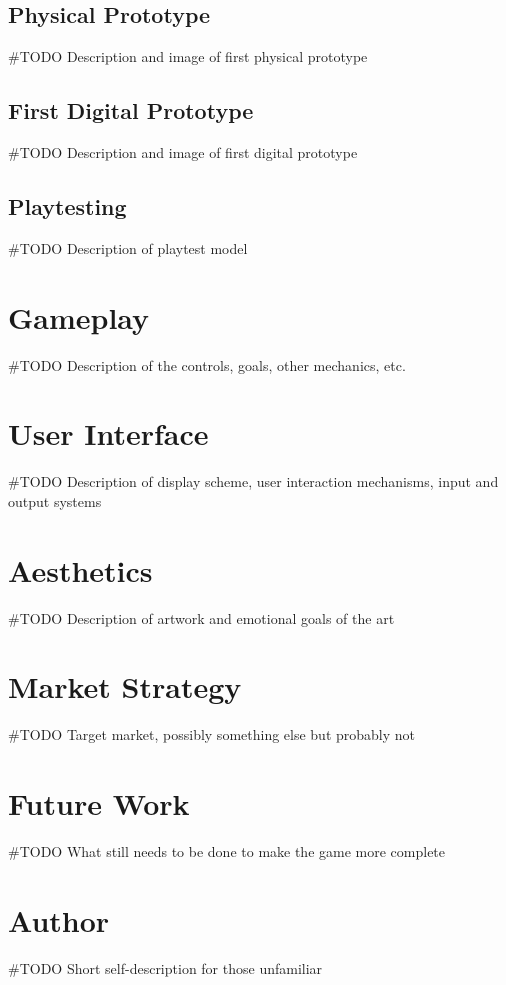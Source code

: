\documentclass{scrreprt}
\begin{document}
		\section{Physical Prototype}
			\#TODO Description and image of first physical prototype
		
		\section{First Digital Prototype}
			\#TODO Description and image of first digital prototype
			
		\section{Playtesting}
			\#TODO Description of playtest model
	
	\chapter{Gameplay}
		\#TODO Description of the controls, goals, other mechanics, etc.
	
	\chapter{User Interface}
		\#TODO Description of display scheme, user interaction mechanisms, input and output systems
		
	\chapter{Aesthetics}
		\#TODO Description of artwork and emotional goals of the art
		
	\chapter{Market Strategy}
		\#TODO Target market, possibly something else but probably not
		
	\chapter{Future Work}
		\#TODO What still needs to be done to make the game more complete
		
	\chapter{Author}
		\#TODO Short self-description for those unfamiliar
		
\end{document}
